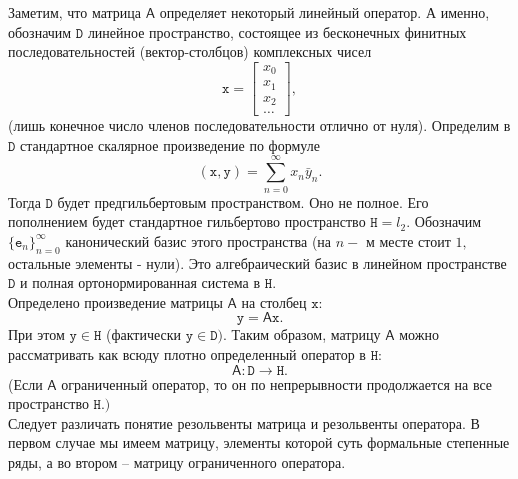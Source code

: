 \documentclass[12 pt, a4 paper]{article}
\theoremstyle{plain}   \newtheorem{Pro}{Задача}
\begin{document}
Заметим, что матрица
$ \mathsf{A} $
определяет некоторый линейный оператор. А именно, обозначим
$ \mathtt{D} $
линейное пространство, состоящее из бесконечных финитных
последовательностей (вектор-столбцов) комплексных чисел
\begin{equation*}
  \mathtt{x}=
  \begin{bmatrix}
   x_0 \\
   x_1 \\
   x_2 \\
   \dots
 \end{bmatrix}
 ,
\end{equation*}
(лишь конечное число членов последовательности отлично
от нуля). Определим в
$ \mathtt{D} $
стандартное скалярное произведение по формуле
$$
  (\mathtt{x},\mathtt{y})=\sum _{n=0}^{\infty} x_n \bar y_n .
$$
Тогда
$ \mathtt{D} $
будет предгильбертовым пространством. Оно не полное. Его
пополнением будет стандартное гильбертово пространство
$ \mathtt{H} = l_2 . $
Обозначим
$ \{ \mathtt{e}_n \} _{n=0}^{\infty} $
канонический базис этого пространства
(на $ n- $ м месте стоит $ 1 ,$ остальные элементы - нули).
Это алгебраический базис в линейном пространстве
$ \mathtt{D} $
и полная ортонормированная система в
$ \mathtt{H} . $
\\
Определено произведение матрицы
$ \mathsf{A} $
на столбец
$ \mathtt{x} : $
$$
  \mathtt{y} = \mathsf{A} \mathtt{x} .
$$
При этом
$ \mathtt{y} \in \mathtt{H} $
(фактически
$ \mathtt{y} \in \mathtt{D} ). $
Таким образом, матрицу
$ \mathsf{A} $
можно рассматривать как всюду плотно определенный оператор в
$ \mathtt{H} : $
$$
  \mathsf{A} : \mathtt{D} \longrightarrow \mathtt{H}.
$$
(Если
$ \mathsf{A} $
ограниченный оператор, то он по непрерывности продолжается на все
пространство
$ \mathtt{H} . ) $
\\
Следует различать понятие резольвенты матрица и резольвенты
оператора. В первом случае мы имеем матрицу, элементы которой суть
формальные степенные ряды, а во втором -- матрицу ограниченного
оператора.
\\
\end{document}
